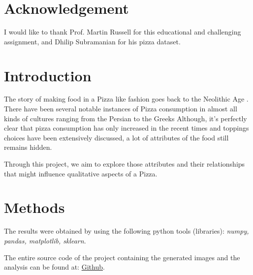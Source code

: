 \documentclass[preprint,12pt]{elsarticle}
\begin{document}
\section{Acknowledgement}
\label{s:acknowledge}
I would like to thank  Prof. Martin Russell for this educational and challenging assignment, and  Dhilip Subramanian for his pizza dataset.

\section{Introduction}
\label{s:introduction}
The story of making food in a Pizza like fashion goes back to the Neolithic Age \cite{pizzaOrigins1991}. There have been several
notable instances of Pizza consumption in almost all kinds of cultures ranging from the Persian to the Greeks \cite{Persian2014} \cite{Greek2000}
Although, it's perfectly clear that pizza consumption has only increased in the recent times and toppings choices have 
been extensively discussed, a lot of attributes of the food still remains hidden. 
\par
Through this project, we aim to explore those attributes and their relationships that might influence qualitative aspects of a Pizza.
\section{Methods}
\label{s:Methods}
The results were obtained by using the following python tools (libraries):  \textit{numpy, pandas, matplotlib, sklearn}. \cite{softwares}
\par
The entire source code of the project containing the generated images and the analysis can be found at: \href{https://github.com/amar-laksh/UNI/tree/master/assignments/IDA/assignment}{Github}.
\end{document}
